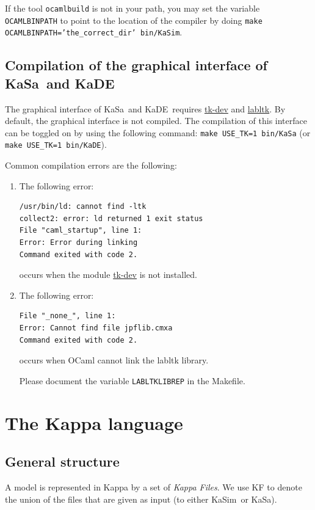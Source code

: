 \documentclass[11pt]{book}
\def\KaSim{\textsf{KaSim}}
\def\KaSa{\textsf{KaSa}}
\def\KaDE{\textsf{KaDE}}
\def\ttt#1{\texttt{#1}}
\begin{document}
If the tool \ttt{ocamlbuild} is not in your path, you may
set the variable \ttt{OCAMLBINPATH} to point to the location of the
compiler by doing \ttt{make OCAMLBINPATH='the\_correct\_dir' bin/KaSim}.

\section{Compilation of the graphical interface of KaSa~and KaDE}

The graphical interface of \KaSa~and \KaDE~requires
\href{http://www.tcl.tk/}{tk-dev} and
\href{https://forge.ocamlcore.org/projects/labltk/}{labltk}. By
default, the graphical interface is not compiled. The compilation of
this interface can be toggled on by using the following command:
\ttt{make USE\_TK=1 bin/KaSa} (or \ttt{make USE\_TK=1 bin/KaDE}).

Common compilation errors are the following:
\begin{enumerate}
\item The following error:

\begin{verbatim}
/usr/bin/ld: cannot find -ltk
collect2: error: ld returned 1 exit status
File "caml_startup", line 1:
Error: Error during linking
Command exited with code 2.
\end{verbatim}

occurs when the module  \href{http://www.tcl.tk/}{tk-dev} is not installed.
\item The following error:

\begin{verbatim}
File "_none_", line 1:
Error: Cannot find file jpflib.cmxa
Command exited with code 2.
\end{verbatim}

occurs when OCaml cannot link the labltk library.

Please document the variable \texttt{LABLTKLIBREP} in the Makefile.

\end{enumerate}

\chapter{The Kappa language}\label{chap:kappa}

\section{General structure}
A model is represented in Kappa by a set of \emph{Kappa Files}. We use
KF to denote the union of the files that are given
as input (to either \KaSim~or \KaSa).
\end{document}
